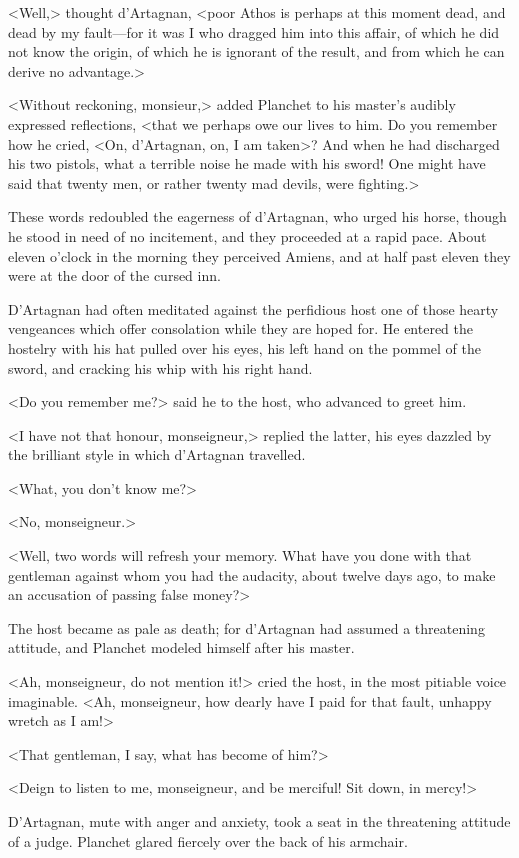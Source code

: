 <Well,> thought d'Artagnan, <poor Athos is perhaps at this moment dead, and dead by my fault---for it was I who dragged him into this affair, of which he did not know the origin, of which he is ignorant of the result, and from which he can derive no advantage.> 

<Without reckoning, monsieur,> added Planchet to his master's audibly expressed reflections, <that we perhaps owe our lives to him. Do you remember how he cried, <On, d'Artagnan, on, I am taken>? And when he had discharged his two pistols, what a terrible noise he made with his sword! One might have said that twenty men, or rather twenty mad devils, were fighting.> 

These words redoubled the eagerness of d'Artagnan, who urged his horse, though he stood in need of no incitement, and they proceeded at a rapid pace. About eleven o'clock in the morning they perceived Amiens, and at half past eleven they were at the door of the cursed inn. 

D'Artagnan had often meditated against the perfidious host one of those hearty vengeances which offer consolation while they are hoped for. He entered the hostelry with his hat pulled over his eyes, his left hand on the pommel of the sword, and cracking his whip with his right hand. 

<Do you remember me?> said he to the host, who advanced to greet him. 

<I have not that honour, monseigneur,> replied the latter, his eyes dazzled by the brilliant style in which d'Artagnan travelled. 

<What, you don't know me?> 

<No, monseigneur.> 

<Well, two words will refresh your memory. What have you done with that gentleman against whom you had the audacity, about twelve days ago, to make an accusation of passing false money?> 

The host became as pale as death; for d'Artagnan had assumed a threatening attitude, and Planchet modeled himself after his master. 

<Ah, monseigneur, do not mention it!> cried the host, in the most pitiable voice imaginable. <Ah, monseigneur, how dearly have I paid for that fault, unhappy wretch as I am!> 

<That gentleman, I say, what has become of him?> 

<Deign to listen to me, monseigneur, and be merciful! Sit down, in mercy!> 

D'Artagnan, mute with anger and anxiety, took a seat in the threatening attitude of a judge. Planchet glared fiercely over the back of his armchair. 

